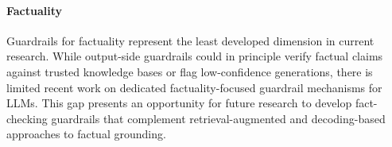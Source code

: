 \paragraph{Factuality}

Guardrails for factuality represent the least developed dimension in current research. While output-side guardrails could in principle verify factual claims against trusted knowledge bases or flag low-confidence generations, there is limited recent work on dedicated factuality-focused guardrail mechanisms for LLMs. This gap presents an opportunity for future research to develop fact-checking guardrails that complement retrieval-augmented and decoding-based approaches to factual grounding.
